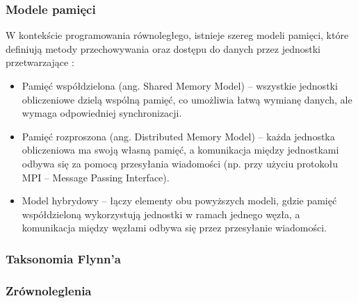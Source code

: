 \subsubsection{Modele pamięci}
W kontekście programowania równoległego, istnieje szereg modeli pamięci, które definiują metody przechowywania oraz dostępu do danych przez jednostki przetwarzające \cite{CUDA}:
\begin{itemize}
    \item Pamięć współdzielona (ang. Shared Memory Model) – wszystkie jednostki obliczeniowe dzielą wspólną pamięć, co umożliwia łatwą wymianę danych, ale wymaga odpowiedniej synchronizacji.
    \item Pamięć rozproszona (ang. Distributed Memory Model) – każda jednostka obliczeniowa ma swoją własną pamięć, a komunikacja między jednostkami odbywa się za pomocą przesyłania wiadomości (np. przy użyciu protokołu MPI – Message Passing Interface).
    \item Model hybrydowy – łączy elementy obu powyższych modeli, gdzie pamięć współdzieloną wykorzystują jednostki w ramach jednego węzła, a komunikacja między węzłami odbywa się przez przesyłanie wiadomości.
\end{itemize}
\subsubsection{Taksonomia Flynn'a}
\subsubsection{Zrównoleglenia}


